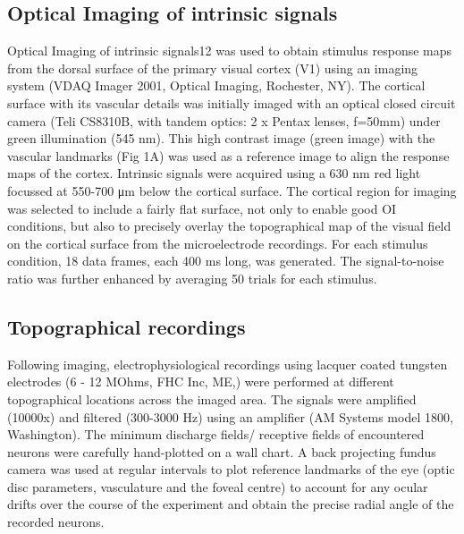 	\subsection{Optical Imaging of intrinsic signals}
	Optical Imaging of intrinsic signals12 was used to obtain stimulus response maps from the dorsal
	surface of the primary visual cortex (V1) using an imaging system (VDAQ Imager 2001, Optical
	Imaging, Rochester, NY). The cortical surface with its vascular details was initially imaged with
	an optical closed circuit camera (Teli CS8310B, with tandem optics: 2 x Pentax lenses, f=50mm)
	under green illumination (545 nm). This high contrast image (green image) with the vascular
	landmarks (Fig 1A) was used as a reference image to align the response maps of the cortex.
	Intrinsic signals were acquired using a 630 nm red light focussed at 550-700 μm below the
	cortical surface. The cortical region for imaging was selected to include a fairly flat surface, not
	only to enable good OI conditions, but also to precisely overlay the topographical map of the
	visual field on the cortical surface from the microelectrode recordings. For each stimulus
	condition, 18 data frames, each 400 ms long, was generated. The signal-to-noise ratio was further
	enhanced by averaging 50 trials for each stimulus.
	\subsection{Topographical recordings}
	Following imaging, electrophysiological recordings using lacquer coated tungsten electrodes (6 -
	12 MOhms, FHC Inc, ME,) were performed at different topographical locations across the
	imaged area. The signals were amplified (10000x) and filtered (300-3000 Hz) using an amplifier
	(AM Systems model 1800, Washington). The minimum discharge fields/ receptive fields of
	encountered neurons were carefully hand-plotted on a wall chart. A back projecting fundus
	camera was used at regular intervals to plot reference landmarks of the eye (optic disc
	parameters, vasculature and the foveal centre) to account for any ocular drifts over the course of
	the experiment and obtain the precise radial angle of the recorded neurons.
